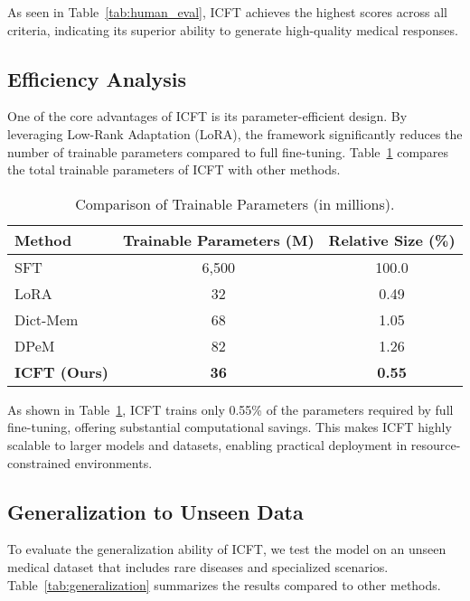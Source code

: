 As seen in Table~\ref{tab:human_eval}, ICFT achieves the highest scores across all criteria, indicating its superior ability to generate high-quality medical responses.


\subsection{Efficiency Analysis}

One of the core advantages of ICFT is its parameter-efficient design. By leveraging Low-Rank Adaptation (LoRA), the framework significantly reduces the number of trainable parameters compared to full fine-tuning. Table~\ref{tab:efficiency} compares the total trainable parameters of ICFT with other methods. 

\begin{table}[ht]
\centering
\caption{Comparison of Trainable Parameters (in millions).}
\label{tab:efficiency}
\begin{tabular}{lcc}
\toprule
\textbf{Method} & \textbf{Trainable Parameters (M)} & \textbf{Relative Size (\%)} \\
\midrule
SFT               & 6,500  & 100.0 \\
LoRA              & 32     & 0.49  \\
Dict-Mem          & 68     & 1.05  \\
DPeM              & 82     & 1.26  \\
\textbf{ICFT (Ours)} & \textbf{36} & \textbf{0.55} \\
\bottomrule
\end{tabular}
\end{table}

As shown in Table~\ref{tab:efficiency}, ICFT trains only 0.55\% of the parameters required by full fine-tuning, offering substantial computational savings. This makes ICFT highly scalable to larger models and datasets, enabling practical deployment in resource-constrained environments.

\subsection{Generalization to Unseen Data}

To evaluate the generalization ability of ICFT, we test the model on an unseen medical dataset that includes rare diseases and specialized scenarios. Table~\ref{tab:generalization} summarizes the results compared to other methods.


